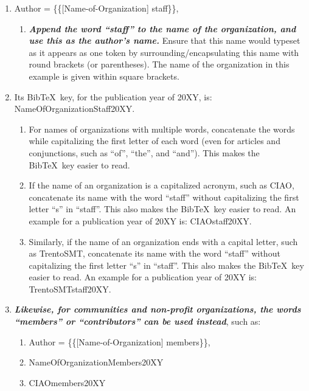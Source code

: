 \documentclass[letter,12pt]{article}
\begin{document}
\begin{enumerate}
\begin{enumerate}
		\begin{enumerate} \itemsep -2pt
		\item Author = \{\{[Name-of-Organization] staff\}\}, \vspace{-0.1cm}
			\begin{enumerate} \itemsep -1pt
			\item {\it \bf Append the word ``staff'' to the name of the organization, and use this as the author's name.} Ensure that this name would typeset as it appears as one token by surrounding/encapsulating this name with round brackets (or parentheses). The name of the organization in this example is given within square brackets.
			\end{enumerate}
		\item Its {\sc Bib}\TeX\ key, for the publication year of 20XY, is: NameOfOrganizationStaff20XY. \vspace{-0.1cm}
			\begin{enumerate} \itemsep -1pt
			\item For names of organizations with multiple words, concatenate the words while capitalizing the first letter of each word (even for articles and conjunctions, such as ``of'', ``the'', and ``and''). This makes the {\sc Bib}\TeX\ key easier to read.
			\item If the name of an organization is a capitalized acronym, such as CIAO, concatenate its name with the word ``staff'' without capitalizing the first letter ``s'' in ``staff''. This also makes the {\sc Bib}\TeX\ key easier to read. An example for a publication year of 20XY is: CIAOstaff20XY.
			\item Similarly, if the name of an organization ends with a capital letter, such as TrentoSMT, concatenate its name with the word ``staff'' without capitalizing the first letter ``s'' in ``staff''. This also makes the {\sc Bib}\TeX\ key easier to read. An example for a publication year of 20XY is: TrentoSMTstaff20XY.
			\end{enumerate}
		\item {\it \bf Likewise, for communities and non-profit organizations, the words ``members'' or ``contributors'' can be used instead}, such as: \vspace{-0.1cm}
			\begin{enumerate} \itemsep -1pt
			\item Author = \{\{[Name-of-Organization] members\}\},
			\item NameOfOrganizationMembers20XY
			\item CIAOmembers20XY

\end{enumerate}
\end{enumerate}
\end{enumerate}
\end{enumerate}
\end{document}
